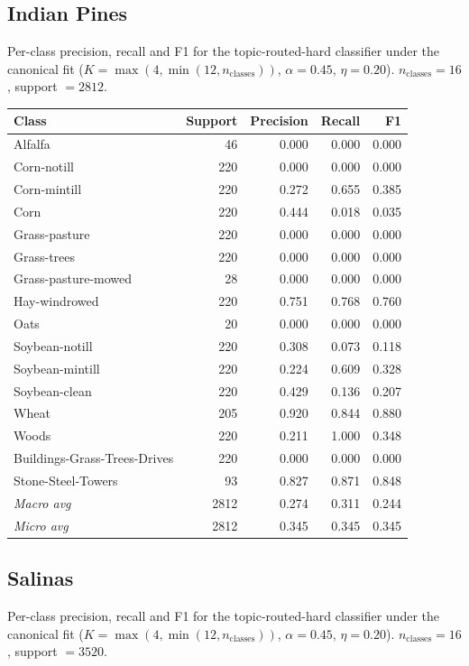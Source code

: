 \subsection*{Indian Pines}
Per-class precision, recall and F1 for the topic-routed-hard classifier under the canonical fit ($K = \max(4, \min(12, n_{\text{classes}}))$, $\alpha = 0.45$, $\eta = 0.20$). $n_{\text{classes}} = 16$, support $= 2812$.

\begin{tabular}{lrrrr}
\toprule
Class & Support & Precision & Recall & F1 \\
\midrule
Alfalfa & 46 & 0.000 & 0.000 & 0.000 \\
Corn-notill & 220 & 0.000 & 0.000 & 0.000 \\
Corn-mintill & 220 & 0.272 & 0.655 & 0.385 \\
Corn & 220 & 0.444 & 0.018 & 0.035 \\
Grass-pasture & 220 & 0.000 & 0.000 & 0.000 \\
Grass-trees & 220 & 0.000 & 0.000 & 0.000 \\
Grass-pasture-mowed & 28 & 0.000 & 0.000 & 0.000 \\
Hay-windrowed & 220 & 0.751 & 0.768 & 0.760 \\
Oats & 20 & 0.000 & 0.000 & 0.000 \\
Soybean-notill & 220 & 0.308 & 0.073 & 0.118 \\
Soybean-mintill & 220 & 0.224 & 0.609 & 0.328 \\
Soybean-clean & 220 & 0.429 & 0.136 & 0.207 \\
Wheat & 205 & 0.920 & 0.844 & 0.880 \\
Woods & 220 & 0.211 & 1.000 & 0.348 \\
Buildings-Grass-Trees-Drives & 220 & 0.000 & 0.000 & 0.000 \\
Stone-Steel-Towers & 93 & 0.827 & 0.871 & 0.848 \\
\midrule
\textit{Macro avg} & 2812 & 0.274 & 0.311 & 0.244 \\
\textit{Micro avg} & 2812 & 0.345 & 0.345 & 0.345 \\
\bottomrule
\end{tabular}

\subsection*{Salinas}
Per-class precision, recall and F1 for the topic-routed-hard classifier under the canonical fit ($K = \max(4, \min(12, n_{\text{classes}}))$, $\alpha = 0.45$, $\eta = 0.20$). $n_{\text{classes}} = 16$, support $= 3520$.

